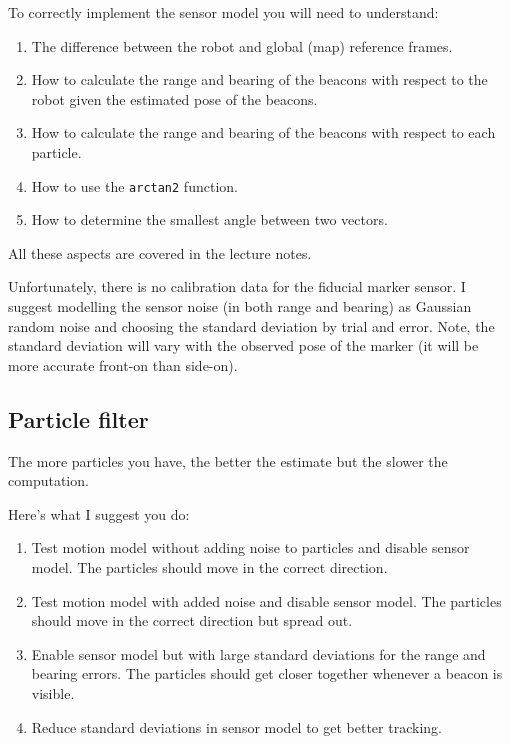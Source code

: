 \documentclass[a4paper, 12]{article}
\newcommand{\code}[1]{\texttt{#1}}
\begin{document}
To correctly implement the sensor model you will need to understand:
%
\begin{enumerate}
\item The difference between the robot and global (map) reference frames.

\item How to calculate the range and bearing of the beacons with
  respect to the robot given the estimated pose of the beacons.

\item How to calculate the range and bearing of the beacons with
  respect to each particle.

\item How to use the \code{arctan2} function.

\item How to determine the smallest angle between two vectors.  
\end{enumerate}
%
All these aspects are covered in the lecture notes.

Unfortunately, there is no calibration data for the fiducial marker
sensor.  I suggest modelling the sensor noise (in both range and
bearing) as Gaussian random noise and choosing the standard deviation
by trial and error.  Note, the standard deviation will vary with the
observed pose of the marker (it will be more accurate front-on than
side-on).

\subsection{Particle filter}

The more particles you have, the better the estimate but the slower
the computation.

Here's what I suggest you do:

\begin{enumerate}
\item Test motion model without adding noise to particles and disable
  sensor model.  The particles should move in the correct direction.

\item Test motion model with added noise and disable sensor model.
  The particles should move in the correct direction but spread out.

\item Enable sensor model but with large standard deviations for the
  range and bearing errors.  The particles should get closer together
  whenever a beacon is visible.

\item Reduce standard deviations in sensor model to get better
  tracking.
\end{enumerate}
\end{document}
